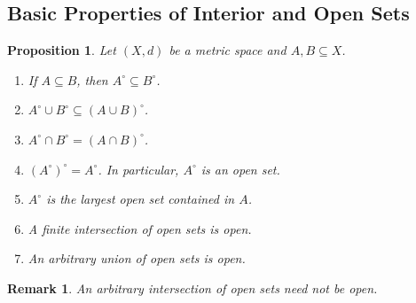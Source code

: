 \documentclass[12pt]{article}
\newtheorem*{remark}{Remark}
\newtheorem{proposition}{Proposition}
\begin{document}
\subsection*{Basic Properties of Interior and Open Sets}
\begin{proposition}
Let $(X,d)$ be a metric space and $A,B\subseteq X$.
\begin{enumerate}[label=\textbf{(\arabic*)}]
  \item If $A\subseteq B$, then $A^\circ\subseteq B^\circ$.
  \item $A^\circ\cup B^\circ\subseteq (A\cup B)^\circ$.
  \item $A^\circ\cap B^\circ=(A\cap B)^\circ$.
  \item $(A^\circ)^\circ=A^\circ$. In particular, $A^\circ$ is an open set.
  \item $A^\circ$ is the largest open set contained in $A$.
  \item A finite intersection of open sets is open.
  \item An arbitrary union of open sets is open.
\end{enumerate}
\end{proposition}

\begin{remark}
An arbitrary intersection of open sets need not be open.
\end{remark}
\end{document}
